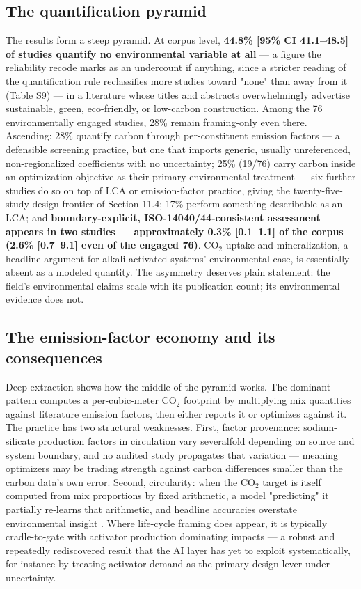 \documentclass[pdflatex,sn-basic]{sn-jnl}
\begin{document}
\subsection{The quantification pyramid}

The results form a steep pyramid. At corpus level, \textbf{44.8\% [95\% CI 41.1--48.5] of studies quantify no environmental variable at all} --- a figure the reliability recode marks as an undercount if anything, since a stricter reading of the quantification rule reclassifies more studies toward "none" than away from it (Table S9) --- in a literature whose titles and abstracts overwhelmingly advertise sustainable, green, eco-friendly, or low-carbon construction. Among the 76 environmentally engaged studies, 28\% remain framing-only even there. Ascending: 28\% quantify carbon through per-constituent emission factors --- a defensible screening practice, but one that imports generic, usually unreferenced, non-regionalized coefficients with no uncertainty; 25\% (19/76) carry carbon inside an optimization objective as their primary environmental treatment --- six further studies do so on top of LCA or emission-factor practice, giving the twenty-five-study design frontier of Section 11.4; 17\% perform something describable as an LCA; and \textbf{boundary-explicit, ISO-14040/44-consistent assessment appears in two studies --- approximately 0.3\% [0.1--1.1] of the corpus (2.6\% [0.7--9.1] even of the engaged 76)}. CO$_2$ uptake and mineralization, a headline argument for alkali-activated systems' environmental case, is essentially absent as a modeled quantity. The asymmetry deserves plain statement: the field's environmental claims scale with its publication count; its environmental evidence does not.

\subsection{The emission-factor economy and its consequences}

Deep extraction shows how the middle of the pyramid works. The dominant pattern computes a per-cubic-meter CO$_2$ footprint by multiplying mix quantities against literature emission factors, then either reports it \citep{alfakih2024} or optimizes against it. The practice has two structural weaknesses. First, factor provenance: sodium-silicate production factors in circulation vary severalfold depending on source and system boundary, and no audited study propagates that variation --- meaning optimizers may be trading strength against carbon differences smaller than the carbon data's own error. Second, circularity: when the CO$_2$ target is itself computed from mix proportions by fixed arithmetic, a model "predicting" it partially re-learns that arithmetic, and headline accuracies overstate environmental insight \citep{alfakih2024}. Where life-cycle framing does appear, it is typically cradle-to-gate with activator production dominating impacts --- a robust and repeatedly rediscovered result that the AI layer has yet to exploit systematically, for instance by treating activator demand as the primary design lever under uncertainty.
\end{document}
